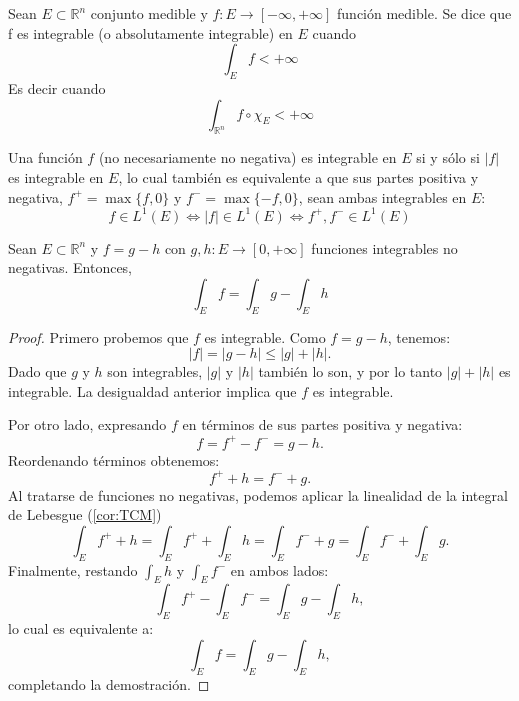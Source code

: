 \begin{definición}
Sean $E \subset \mathbb{R}^n$ conjunto medible y $f: E \to [-\infty, +\infty]$ función medible. Se dice que f es integrable (o absolutamente integrable) en $E$ cuando 
$$\int_{E}f < +\infty$$ 
Es decir cuando 
$$\int_{\mathbb{R}^n}f \circ \chi_E < +\infty$$
\end{definición}

\begin{observación}
    Una función \( f \) (no necesariamente no negativa) es integrable en \( E \) si y sólo si \( |f| \) es integrable en \( E \), lo cual también es equivalente a que sus partes positiva y negativa, \( f^+ = \max\{f, 0\} \) y \( f^- = \max\{-f, 0\} \), sean ambas integrables en \( E \):
    \[
    f \in L^1(E) \iff |f| \in L^1(E) \iff f^+, f^- \in L^1(E)
    \]
\end{observación}

\begin{lema}
    Sean $E \subset \mathbb{R}^n$ y $f = g - h$ con $g, h: E \to [0, +\infty]$ funciones integrables no negativas. Entonces, $$ \int_{E}f = \int_{E}g - \int_{E}h$$
    \label{lema:IntegralResta}
\end{lema}

\begin{proof}
    Primero probemos que $f$ es integrable. Como $f = g - h$, tenemos:
    \[ |f| = |g - h| \leq |g| + |h|. \]
    Dado que $g$ y $h$ son integrables, $|g|$ y $|h|$ también lo son, y por lo tanto $|g| + |h|$ es integrable. La desigualdad anterior implica que $f$ es integrable.

    Por otro lado, expresando $f$ en términos de sus partes positiva y negativa:
    \[ f = f^+ - f^- = g - h. \]
    Reordenando términos obtenemos:
    \[ f^+ + h = f^- + g. \]
    Al tratarse de funciones no negativas, podemos aplicar la linealidad de la integral de Lebesgue (\cref{cor:TCM})
    \[ \int_{E} f^+ + h = \int_{E} f^+ + \int_{E} h = \int_{E} f^- + g = \int_{E} f^- + \int_{E} g. \]
    Finalmente, restando $\int_{E} h$ y $\int_{E} f^-$ en ambos lados:
    \[ \int_{E} f^+ - \int_{E} f^- = \int_{E} g - \int_{E} h, \]
    lo cual es equivalente a:
    \[ \int_{E} f = \int_{E} g - \int_{E} h, \]
    completando la demostración.
\end{proof}

